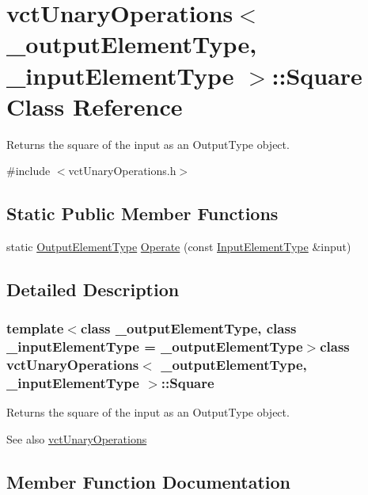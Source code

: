 \hypertarget{classvct_unary_operations_1_1_square}{}\section{vct\+Unary\+Operations$<$ \+\_\+output\+Element\+Type, \+\_\+input\+Element\+Type $>$\+:\+:Square Class Reference}
\label{classvct_unary_operations_1_1_square}


Returns the square of the input as an Output\+Type object.  




{\ttfamily \#include $<$vct\+Unary\+Operations.\+h$>$}

\subsection*{Static Public Member Functions}
\begin{DoxyCompactItemize}
\item 
static \hyperlink{classvct_unary_operations_a42306ac3dd20d32c6d6c66ac3fa2e7b9}{Output\+Element\+Type} \hyperlink{classvct_unary_operations_1_1_square_a2896b836b2ee268259ca078cf2d907f5}{Operate} (const \hyperlink{classvct_unary_operations_abf3b77bb7b8abd7ba72a6a45a65696a7}{Input\+Element\+Type} \&input)
\end{DoxyCompactItemize}


\subsection{Detailed Description}
\subsubsection*{template$<$class \+\_\+output\+Element\+Type, class \+\_\+input\+Element\+Type = \+\_\+output\+Element\+Type$>$class vct\+Unary\+Operations$<$ \+\_\+output\+Element\+Type, \+\_\+input\+Element\+Type $>$\+::\+Square}

Returns the square of the input as an Output\+Type object. 

\begin{DoxySeeAlso}{See also}
\hyperlink{classvct_unary_operations}{vct\+Unary\+Operations} 
\end{DoxySeeAlso}


\subsection{Member Function Documentation}
\hypertarget{classvct_unary_operations_1_1_square_a2896b836b2ee268259ca078cf2d907f5}{}
